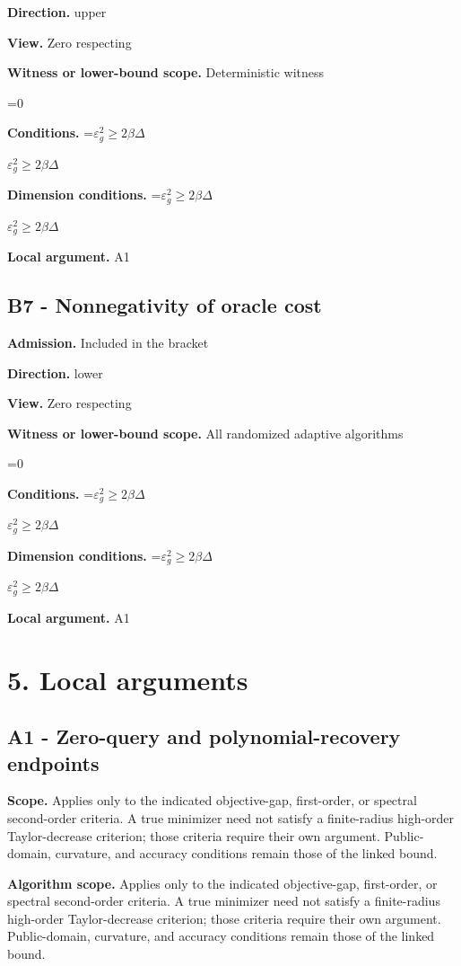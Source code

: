 \documentclass[10pt,a4paper]{article}
\newcommand{\AtlasMath}[1]{\par\begingroup\centering\setbox0=\hbox{$\displaystyle #1$}\ifdim\wd0>1.4\linewidth\typeout{ATLAS WIDE FORMULA: \the\wd0}\fi\ifdim\wd0>\linewidth\resizebox{\linewidth}{!}{\box0}\else\box0\fi\par\endgroup}
\newcommand{\AtlasInlineMath}[1]{\begingroup\setbox0=\hbox{$#1$}\ifdim\wd0>.4\linewidth\endgroup\AtlasMath{#1}\else\endgroup$#1$\fi}
\begin{document}
\textbf{Direction.} upper

\textbf{View.} Zero respecting

\textbf{Witness or lower-bound scope.} Deterministic witness

\AtlasMath{0}
\textbf{Conditions.} \AtlasInlineMath{\varepsilon_g^2\ge2\beta\Delta}

\textbf{Dimension conditions.} \AtlasInlineMath{\varepsilon_g^2\ge2\beta\Delta}

\textbf{Local argument.} A1

\subsection{B7 - Nonnegativity of oracle cost}
\textbf{Admission.} Included in the bracket

\textbf{Direction.} lower

\textbf{View.} Zero respecting

\textbf{Witness or lower-bound scope.} All randomized adaptive algorithms

\AtlasMath{0}
\textbf{Conditions.} \AtlasInlineMath{\varepsilon_g^2\ge2\beta\Delta}

\textbf{Dimension conditions.} \AtlasInlineMath{\varepsilon_g^2\ge2\beta\Delta}

\textbf{Local argument.} A1

\section{5. Local arguments}
\subsection{A1 - Zero-query and polynomial-recovery endpoints}
\textbf{Scope.} Applies only to the indicated objective-gap, first-order, or spectral second-order criteria. A true minimizer need not satisfy a finite-radius high-order Taylor-decrease criterion; those criteria require their own argument. Public-domain, curvature, and accuracy conditions remain those of the linked bound.

\textbf{Algorithm scope.} Applies only to the indicated objective-gap, first-order, or spectral second-order criteria. A true minimizer need not satisfy a finite-radius high-order Taylor-decrease criterion; those criteria require their own argument. Public-domain, curvature, and accuracy conditions remain those of the linked bound.
\end{document}
